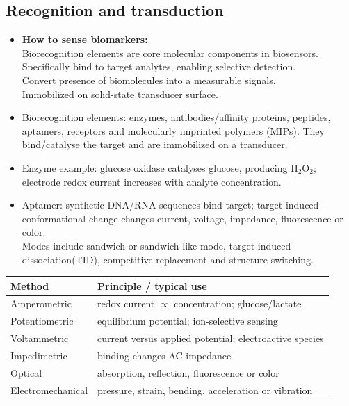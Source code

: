 \documentclass[10pt,a4paper]{ctexart}
\newcommand{\key}[1]{\textbf{#1}}
\begin{document}
\begin{multicols*}{3}
\subsection{Recognition and transduction}
\begin{itemize}
  \item \key{How to sense biomarkers:}\\
  Biorecognition elements are core molecular components in biosensors.\\
  Specifically bind to target analytes, enabling selective detection.\\
  Convert presence of biomolecules into a measurable signals.\\
  Immobilized on solid-state transducer surface.
  \item Biorecognition elements: enzymes, antibodies/affinity proteins,
  peptides, aptamers, receptors and molecularly imprinted polymers (MIPs).
  They bind/catalyse the target and are immobilized on a transducer.
  \item Enzyme example: glucose oxidase catalyses glucose, producing H$_2$O$_2$;
  electrode redox current increases with analyte concentration.
  \item Aptamer: synthetic DNA/RNA sequences bind target; target-induced
  conformational change changes current, voltage, impedance, fluorescence
  or color. \\
  Modes include sandwich or sandwich-like mode, target-induced dissociation(TID), 
  competitive replacement and structure switching.
\end{itemize}

\begin{center}\footnotesize
\begin{tabularx}{\linewidth}{@{}lY@{}}
\toprule
Method & Principle / typical use\\
\midrule
Amperometric & redox current $\propto$ concentration; glucose/lactate\\
Potentiometric & equilibrium potential; ion-selective sensing\\
Voltammetric & current versus applied potential; electroactive species\\
Impedimetric & binding changes AC impedance\\
Optical & absorption, reflection, fluorescence or color\\
Electromechanical & pressure, strain, bending, acceleration or vibration\\
\bottomrule
\end{tabularx}
\end{center}


\end{multicols*}
\end{document}
